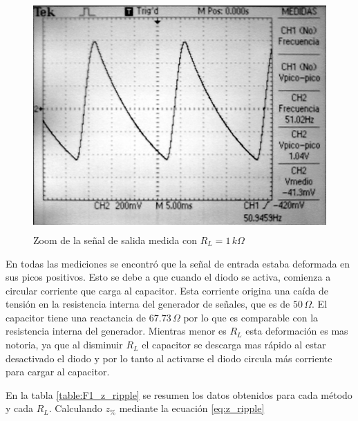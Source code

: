 \documentclass[10pt,spanish,a4paper,openany,notitlepage]{article}
\begin{document}
\begin{enumerate}
    \begin{figure}[H]
    \centering
    \includegraphics[width=350pt, height=250pt]{mediciones/F1-1K-CA.jpg}
    \caption{Zoom de la señal de salida medida con $R_L = 1\,\unit{k\Omega}$}
    \label{fig:F1_1k_ca_med}
    \end{figure}
    
\end{enumerate}

En todas las mediciones se encontró que la señal de entrada estaba deformada en sus picos positivos.
Esto se debe a que cuando el diodo se activa, comienza a circular corriente que carga al capacitor.
Esta corriente origina una caída de tensión en la resistencia interna del generador de señales, que
es de $50\,\unit{\Omega}$. El capacitor tiene una reactancia de $67.73\,\unit{\Omega}$ por lo que 
es comparable con la resistencia interna del generador.
Mientras menor es $R_L$ esta deformación es mas notoria, ya que
al disminuir $R_L$ el capacitor se descarga mas rápido al estar desactivado el diodo y por lo tanto
al activarse el diodo circula más corriente para cargar al capacitor.

En la tabla \ref{table:F1_z_ripple} se resumen los datos obtenidos para cada método y cada $R_L$. Calculando $z_{\%}$ mediante la ecuación \ref{eq:z_ripple}
\end{document}
